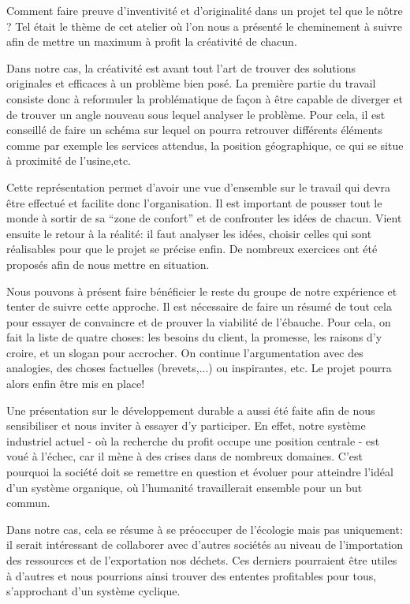 \documentclass[a4paper, oneside, 12pt]{article}
\begin{document}
Comment faire preuve d'inventivité et d'originalité dans un projet tel que le nôtre ?
Tel était le thème de cet atelier où l'on nous a présenté le cheminement 
à suivre afin de mettre un maximum à profit la créativité de chacun.

Dans notre cas, la créativité est avant tout l'art de trouver des solutions 
originales et efficaces à un problème bien posé. 
La première partie du travail consiste donc à reformuler la problématique de façon 
à être capable de diverger et de trouver un angle nouveau sous lequel analyser le problème. 
Pour cela, il est conseillé de faire un schéma sur lequel on pourra retrouver différents
éléments comme par exemple les services attendus, la position géographique, 
ce qui se situe à proximité de l’usine,etc.

Cette représentation permet d'avoir une vue d'ensemble sur le travail qui 
devra être effectué et facilite donc l'organisation. Il est important de pousser tout
le monde à sortir de sa ``zone de confort'' et de confronter les idées de chacun.
Vient ensuite le retour à la réalité: il faut analyser les idées, choisir celles qui 
sont réalisables pour que le projet se précise enfin. De nombreux exercices ont été 
proposés afin de nous mettre en situation. 

Nous pouvons à présent faire bénéficier le reste du groupe de notre expérience et tenter
de suivre cette approche. Il est nécessaire de faire un résumé de tout cela pour essayer 
de convaincre et de prouver la viabilité de l'ébauche. Pour cela, on fait la liste 
de quatre choses: les besoins du client, la promesse, les raisons d'y croire, 
et un slogan pour accrocher. On continue l'argumentation avec des analogies,
des choses factuelles (brevets,...) ou inspirantes, etc. Le projet pourra alors
enfin être mis en place!

Une présentation sur le développement durable a aussi été faite afin de nous sensibiliser
et nous inviter à essayer d'y participer. 
En effet, notre système industriel actuel - où la recherche du profit occupe une position
centrale - est voué à l'échec, car il mène à des crises dans de nombreux domaines.
C'est pourquoi la société doit se remettre en question et évoluer pour atteindre
l'idéal d'un système organique, où l'humanité travaillerait ensemble pour un but commun. 

Dans notre cas, cela se résume à se préoccuper de l'écologie mais pas uniquement:
il serait intéressant de collaborer avec d'autres sociétés au niveau de l'importation
des ressources et de l'exportation nos déchets. Ces derniers pourraient être utiles
à d'autres et nous pourrions ainsi trouver des ententes profitables pour tous,
s'approchant d'un système cyclique.


\appendix


\end{document}

